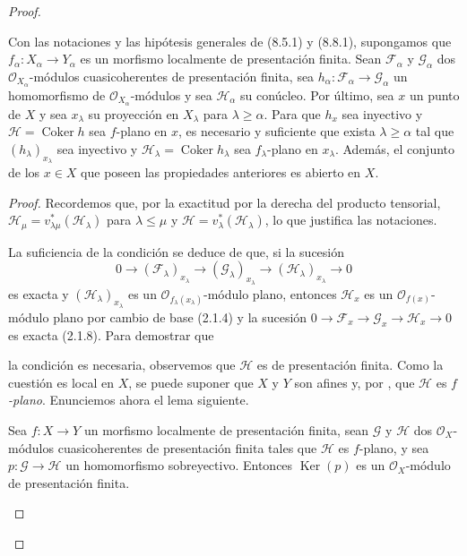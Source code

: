 \begin{proof}
\begin{proposition}[11.3.9]
\label{IV.11.3.9}
Con las notaciones y las hipótesis generales de (8.5.1) y (8.8.1), supongamos que $f_\alpha:X_\alpha\to Y_\alpha$ es un morfismo localmente de presentación finita. Sean $\mathcal F_\alpha$ y $\mathcal G_\alpha$ dos $\mathcal O_{X_\alpha}$-módulos cuasicoherentes de presentación finita, sea $h_\alpha:\mathcal F_\alpha\to\mathcal G_\alpha$ un homomorfismo de $\mathcal O_{X_\alpha}$-módulos y sea $\mathcal H_\alpha$ su conúcleo. Por último, sea $x$ un punto de $X$ y sea $x_\lambda$ su proyección en $X_\lambda$ para $\lambda\geq\alpha$. Para que $h_x$ sea inyectivo y $\mathcal H=\operatorname{Coker}h$ sea $f$-plano en $x$, es necesario y suficiente que exista $\lambda\geq\alpha$ tal que $(h_\lambda)_{x_\lambda}$ sea inyectivo y $\mathcal H_\lambda=\operatorname{Coker}h_\lambda$ sea $f_\lambda$-plano en $x_\lambda$. Además, el conjunto de los $x\in X$ que poseen las propiedades anteriores es abierto en $X$.
\end{proposition}

\begin{proof}
Recordemos que, por la exactitud por la derecha del producto tensorial,
$\mathcal H_\mu=v_{\lambda\mu}^*(\mathcal H_\lambda)$ para $\lambda\leq\mu$ y
$\mathcal H=v_\lambda^*(\mathcal H_\lambda)$,
lo que justifica las notaciones.

La suficiencia de la condición se deduce de que, si la sucesión
\[
0\longrightarrow(\mathcal F_\lambda)_{x_\lambda}
\longrightarrow(\mathcal G_\lambda)_{x_\lambda}
\longrightarrow(\mathcal H_\lambda)_{x_\lambda}\longrightarrow0
\]
es exacta y $(\mathcal H_\lambda)_{x_\lambda}$ es un $\mathcal O_{f_\lambda(x_\lambda)}$-módulo plano, entonces $\mathcal H_x$ es un $\mathcal O_{f(x)}$-módulo plano por cambio de base (2.1.4) y la sucesión
$0\to\mathcal F_x\to\mathcal G_x\to\mathcal H_x\to0$
es exacta (2.1.8). Para demostrar que


la condición es necesaria, observemos que $\mathcal H$ es de presentación finita. Como la cuestión es local en $X$, se puede suponer que $X$ y $Y$ son afines y, por , que $\mathcal H$ es \emph{$f$-plano}. Enunciemos ahora el lema siguiente.

\begin{lemma}[11.3.9.1]
\label{IV.11.3.9.1}
Sea $f:X\to Y$ un morfismo localmente de presentación finita, sean $\mathcal G$ y $\mathcal H$ dos $\mathcal O_X$-módulos cuasicoherentes de presentación finita tales que $\mathcal H$ es $f$-plano, y sea $p:\mathcal G\to\mathcal H$ un homomorfismo sobreyectivo. Entonces $\operatorname{Ker}(p)$ es un $\mathcal O_X$-módulo de presentación finita.
\end{lemma}


\end{proof}
\end{proof}
